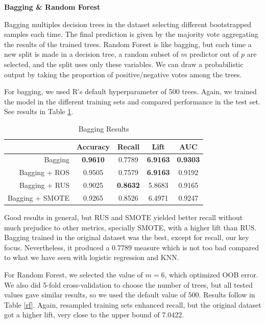 \documentclass[12pt,letterpaper]{article}
\begin{document}
\textbf{Bagging \& Random Forest}
	
	Bagging multiples decision trees in the dataset selecting different bootstrapped samples each time. The final prediction is given by the majority vote aggregating the results of the trained trees. Random Forest is like bagging, but each time a new split is made in a decision tree, a random subset of $m$ predictor out of $p$ are selected, and the split uses only these variables. We can draw a probabilistic output by taking the proportion of positive/negative votes among the trees. 
	
For bagging, we used R's default hyperparameter of 500 trees. Again, we trained the model in the different training sets and compared performance in the test set. See results in Table \ref{bag1}.

\begin{table}[!htb]
	\centering
	\addtolength{\tabcolsep}{6pt}
	\begin{tabular}{|r|cccc|}
		\hline
		& Accuracy & Recall & Lift & AUC \\ 
		\hline
		Bagging  & \textbf{0.9610} & 0.7789 & \textbf{6.9163} & \textbf{0.9303} \\ 
		Bagging + ROS & 0.9505 & 0.7579 &\textbf{ 6.9163} & 0.9192 \\ 
		Bagging + RUS & 0.9025 & \textbf{0.8632} & 5.8683 & 0.9165 \\ 
		Bagging + SMOTE & 0.9265 & 0.8526 & 6.4971 & 0.9247 \\ 
		\hline
	\end{tabular}
\caption{Bagging Results}
\label{bag1}
\end{table}

Good results in general, but RUS and SMOTE yielded better recall without much prejudice to other metrics, specially SMOTE, with a higher lift than RUS. Bagging trained in the original dataset was the best, except for recall, our key focus. Nevertheless, it produced a 0.7789 measure which is not too bad compared to what we have seen with logistic regression and KNN.

For Random Forest, we selected the value of $m=6$, which optimized OOB error. We also did 5-fold cross-validation to choose the number of trees, but all tested values gave similar results, so we used the default value of 500. Results follow in Table \ref{rf}. Again, resampled training sets enhanced recall, but the original dataset got a higher lift, very close to the upper bound of 7.0422.
\end{document}

